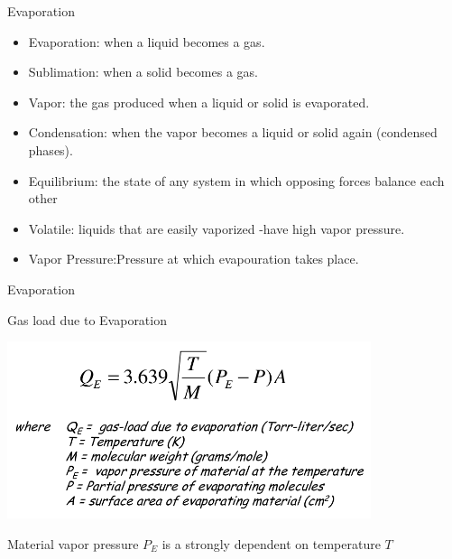 \documentclass[11]{beamer}
\begin{document}
\begin{frame}{Evaporation}

\begin{itemize}
\item Evaporation: when a liquid becomes a gas.
\item Sublimation: when a solid becomes a gas.
\item Vapor: the gas produced when a liquid or solid is evaporated.
\item Condensation: when the vapor becomes a liquid or solid again (condensed phases).
\item Equilibrium: the state of any system in which opposing forces balance each other
\item Volatile: liquids that are easily vaporized -have high vapor pressure.
\item Vapor Pressure:Pressure at which evapouration takes place.
\end{itemize}


\end{frame}


\begin{frame}{Evaporation}

\begin{exampleblock}{Gas load due to Evaporation}
       \begin{center}
			\includegraphics[width=0.8\textwidth]{EvaporationFormula.png}
		\end{center}
Material vapor pressure $P_{E} $ is a strongly dependent on temperature $T$

\end{exampleblock}

\end{frame}
\end{document}
